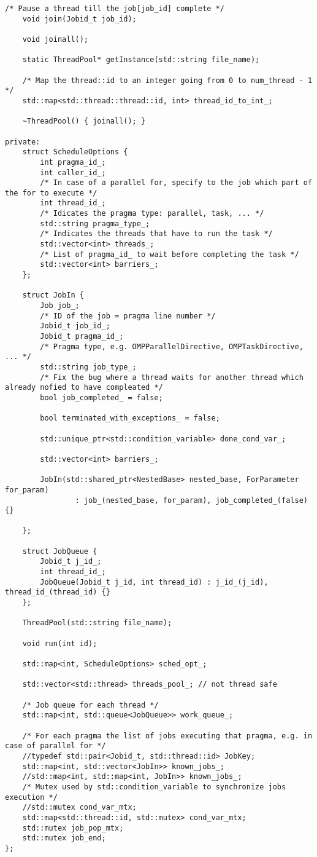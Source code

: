 \documentclass[a4paper,11pt,twoside]{book}
\begin{document}
\begin{lstlisting}[language=CCC, caption=thread\_pool.h]
    /* Pause a thread till the job[job_id] complete */
    void join(Jobid_t job_id);

    void joinall();

    static ThreadPool* getInstance(std::string file_name);

    /* Map the thread::id to an integer going from 0 to num_thread - 1 */
    std::map<std::thread::thread::id, int> thread_id_to_int_;

    ~ThreadPool() { joinall(); }

private:
    struct ScheduleOptions {
        int pragma_id_;
        int caller_id_;
        /* In case of a parallel for, specify to the job which part of the for to execute */
        int thread_id_;
        /* Idicates the pragma type: parallel, task, ... */
        std::string pragma_type_;
        /* Indicates the threads that have to run the task */
        std::vector<int> threads_;
        /* List of pragma_id_ to wait before completing the task */
        std::vector<int> barriers_;
    };

    struct JobIn {
        Job job_;
        /* ID of the job = pragma line number */
        Jobid_t job_id_;
        Jobid_t pragma_id_;
        /* Pragma type, e.g. OMPParallelDirective, OMPTaskDirective, ... */
        std::string job_type_;
        /* Fix the bug where a thread waits for another thread which already nofied to have compleated */
        bool job_completed_ = false;

        bool terminated_with_exceptions_ = false;

        std::unique_ptr<std::condition_variable> done_cond_var_;

        std::vector<int> barriers_;

        JobIn(std::shared_ptr<NestedBase> nested_base, ForParameter for_param)
                : job_(nested_base, for_param), job_completed_(false) {}

    };

    struct JobQueue {
        Jobid_t j_id_;
        int thread_id_;
        JobQueue(Jobid_t j_id, int thread_id) : j_id_(j_id), thread_id_(thread_id) {}
    };

    ThreadPool(std::string file_name);
    
    void run(int id);

    std::map<int, ScheduleOptions> sched_opt_;

    std::vector<std::thread> threads_pool_; // not thread safe
    
    /* Job queue for each thread */
    std::map<int, std::queue<JobQueue>> work_queue_;
    
    /* For each pragma the list of jobs executing that pragma, e.g. in case of parallel for */
    //typedef std::pair<Jobid_t, std::thread::id> JobKey;
    std::map<int, std::vector<JobIn>> known_jobs_;
    //std::map<int, std::map<int, JobIn>> known_jobs_;
    /* Mutex used by std::condition_variable to synchronize jobs execution */
    //std::mutex cond_var_mtx;
    std::map<std::thread::id, std::mutex> cond_var_mtx;
    std::mutex job_pop_mtx;
    std::mutex job_end;
};

\end{lstlisting}
\end{document}
